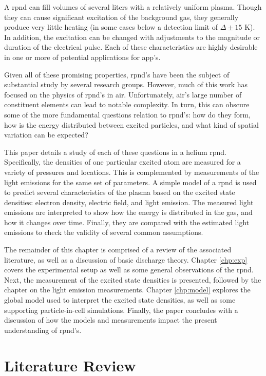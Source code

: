 A \acs{rpnd} can fill volumes of several liters with a relatively uniform
plasma. Though they can cause significant excitation of the background gas, they
generally produce very little heating (in some cases below a detection limit of
$\Delta \pm 15$ K). In addition, the excitation can be changed with adjustments
to the magnitude or duration of the electrical pulse. Each of these
characteristics are highly desirable in one or more of potential applications
for \acs{app}'s.

Given all of these promising properties, \acs{rpnd}'s have been the subject of
substantial study by several research groups. However, much of this work has
focused on the physics of \acs{rpnd}'s in air. Unfortunately, air's large number
of constituent elements can lead to notable complexity. In turn, this can
obscure some of the more fundamental questions relation to \acs{rpnd}'s: how do
they form, how is the energy distributed between excited particles, and what
kind of spatial variation can be expected?

This paper details a study of each of these questions in a helium \acs{rpnd}.
Specifically, the densities of one particular excited atom are measured for a
variety of pressures and locations. This is complemented by measurements of the
light emissions for the same set of parameters. A simple model of a \acs{rpnd}
is used to predict several characteristics of the plasma based on the excited
state densities: electron density, electric field, and light emission. The
measured light emissions are interpreted to show how the energy is distributed
in the gas, and how it changes over time. Finally, they are compared with the
estimated light emissions to check the validity of several common assumptions.

The remainder of this chapter is comprised of a review of the associated
literature, as well as a discussion of basic discharge theory. Chapter
\ref{chp:exp} covers the experimental setup as well as some general observations
of the \acs{rpnd}. Next, the measurement of the excited state densities is
presented, followed by the chapter on the light emission measurements. Chapter
\ref{chp:model} explores the global model used to interpret the excited state
densities, as well as some supporting particle-in-cell simulations. Finally, the
paper concludes with a discussion of how the models and measurements impact the
present understanding of \acs{rpnd}'s.

\section{Literature Review}

